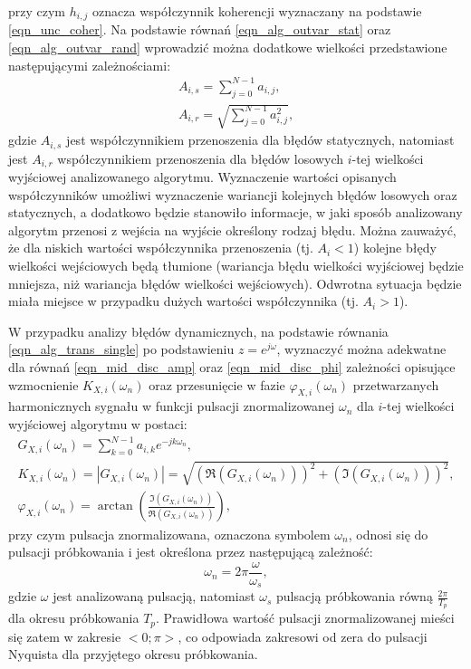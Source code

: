 przy czym $h_{i,j}$ oznacza współczynnik koherencji wyznaczany na podstawie \eqref{eqn_unc_coher}. Na podstawie równań \eqref{eqn_alg_outvar_stat} oraz \eqref{eqn_alg_outvar_rand} wprowadzić można dodatkowe wielkości przedstawione następującymi zależnościami:
\begin{gather}
A_{i,s} = \sum _{j = 0} ^{N-1} a_{i, j} \label{eqn_alg_trans_stat}, \\
A_{i,r} = \sqrt{\sum _{j = 0} ^{N-1} a_{i, j}^{2}} \label{eqn_alg_trans_rand},
\end{gather}
gdzie $A_{i,s}$ jest współczynnikiem przenoszenia dla błędów statycznych, natomiast jest $A_{i,r}$ współczynnikiem przenoszenia dla błędów losowych $i$-tej wielkości wyjściowej analizowanego algorytmu. Wyznaczenie wartości opisanych współczynników umożliwi wyznaczenie wariancji kolejnych błędów losowych oraz statycznych, a dodatkowo będzie stanowiło informacje, w jaki sposób analizowany algorytm przenosi z wejścia na wyjście określony rodzaj błędu. Można zauważyć, że dla niskich wartości współczynnika przenoszenia (tj. $A_{i} < 1$) kolejne błędy wielkości wejściowych będą tłumione (wariancja błędu wielkości wyjściowej będzie mniejsza, niż wariancja błędów wielkości wejściowych). Odwrotna sytuacja będzie miała miejsce w przypadku dużych wartości współczynnika (tj. $A_{i} > 1$).

W przypadku analizy błędów dynamicznych, na podstawie równania \eqref{eqn_alg_trans_single} po podstawieniu $z = e^{j\omega}$, wyznaczyć można adekwatne dla równań \eqref{eqn_mid_disc_amp} oraz \eqref{eqn_mid_disc_phi} zależności opisujące wzmocnienie $K_{X,i}(\omega_{n})$ oraz przesunięcie w fazie $\varphi_{X,i}(\omega_{n})$ przetwarzanych harmonicznych sygnału w funkcji pulsacji znormalizowanej $\omega_{n}$ dla $i$-tej wielkości wyjściowej algorytmu w postaci:
\begin{gather}
G_{X,i} \left( \omega_{n} \right) = \sum _{k = 0} ^{N-1} a_{i,k} e^{-j k \omega_{n}} \label{eqn_alg_trans_norm}, \\
K_{X,i} \left( \omega_{n} \right) = \left| G_{X,i} \left( \omega_{n} \right) \right| = \sqrt{\left( \Re \left( G_{X,i} \left( \omega_{n} \right) \right) \right)^2 + \left( \Im \left( G_{X,i} \left( \omega_{n} \right) \right) \right)^2} \label{eqn_alg_trans_amp}, \\
\varphi_{X,i} \left( \omega_{n} \right) = \arctan \left( \frac{\Im  \left( G_{X,i} \left( \omega_{n} \right) \right)}{\Re  \left( G_{X,i} \left( \omega_{n} \right) \right)} \right) \label{eqn_alg_trans_phi},
\end{gather}
przy czym pulsacja znormalizowana, oznaczona symbolem $\omega_{n}$, odnosi się do pulsacji próbkowania i jest określona przez następującą zależność:
\begin{equation}
\omega_{n} = 2\pi \frac{\omega}{\omega_{s}} \label{eqn_puls_norm},
\end{equation}
gdzie $\omega$ jest analizowaną pulsacją, natomiast $\omega_{s}$ pulsacją próbkowania równą $\frac{2 \pi}{T_{p}}$ dla okresu próbkowania $T_{p}$. Prawidłowa wartość pulsacji znormalizowanej mieści się zatem w zakresie $<0;\pi>$, co odpowiada zakresowi od zera do pulsacji Nyquista dla przyjętego okresu próbkowania.

